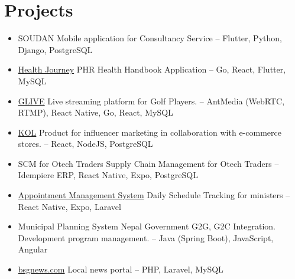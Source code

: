 \documentclass[letterpaper,11pt]{article}
\newcommand{\resumeItem}[1]{
	\item\small{
		{ #1 \vspace{-2pt}}
	}
}
\newcommand{\resumeSubItem}[2]{\resumeItem{#1}{#2}\vspace{-4pt}}
\newcommand{\resumeSubHeadingListStart}{\begin{itemize}[leftmargin=*]}
\newcommand{\resumeSubHeadingListEnd}{\end{itemize}}
\begin{document}
	\section{Projects}
	\resumeSubHeadingListStart
	\resumeSubItem{SOUDAN}
	{Mobile application for Consultancy Service -- Flutter, Python, Django, PostgreSQL}
	\resumeSubItem{\href{https://health-journey.jp/}{Health Journey}}
	{PHR Health Handbook Application -- Go, React, Flutter, MySQL}
	\resumeSubItem{\href{https://www.glive-official.co.jp/}{GLIVE}}
	{Live streaming platform for Golf Players. -- AntMedia (WebRTC, RTMP), React Native, Go, React, MySQL}
	\resumeSubItem{\href{https://kol-tech.co.jp/}{KOL}}
	{Product for influencer marketing in collaboration with e-commerce stores. -- React, NodeJS, PostgreSQL}
	\resumeSubItem{SCM for Otech Traders}
	{Supply Chain Management for Otech Traders -- Idempiere ERP, React Native, Expo, PostgreSQL}
	\resumeSubItem{\href{https://play.google.com/store/apps/details?id=com.phoenix.tourism_ministry.appointment&hl=en_us}{Appointment Management System}}
	{Daily Schedule Tracking for ministers -- React Native, Expo, Laravel}
	\resumeSubItem{Municipal Planning System}
	{Nepal Government G2G, G2C Integration. Development program management. -- Java (Spring Boot), JavaScript, Angular}
	\resumeSubItem{\href{https://bsgnews.com}{bsgnews.com}}
	{Local news portal -- PHP, Laravel, MySQL}
	\resumeSubHeadingListEnd
	
	
	
\end{document}
